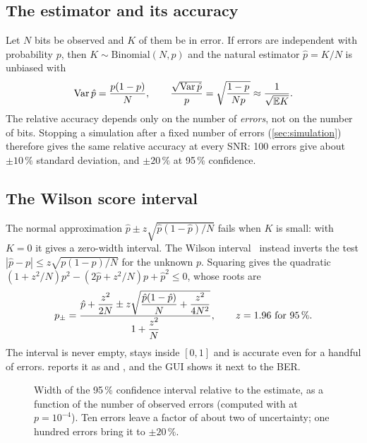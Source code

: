 \subsection{The estimator and its accuracy}
Let $N$ bits be observed and $K$ of them be in error. If errors are independent with
probability $p$, then $K\sim\mathrm{Binomial}(N,p)$ and the natural estimator
$\hat p=K/N$ is unbiased with
\begin{equation}
  \operatorname{Var}\hat p=\frac{p(1-p)}{N},\qquad
  \frac{\sqrt{\operatorname{Var}\hat p}}{p}=\sqrt{\frac{1-p}{Np}}\approx\frac{1}{\sqrt{\mathbb{E} K}} .
\end{equation}
The relative accuracy depends only on the number of \emph{errors}, not on the number of bits.
Stopping a simulation after a fixed number of errors (\cref{sec:simulation}) therefore gives the
same relative accuracy at every SNR: 100 errors give about $\pm10\,\%$ standard deviation, and
$\pm20\,\%$ at 95\,\% confidence.

\subsection{The Wilson score interval}
The normal approximation $\hat p\pm z\sqrt{\hat p(1-\hat p)/N}$ fails when $K$ is small: with
$K=0$ it gives a zero-width interval. The Wilson interval~\cite{wilson1927} instead inverts the test
$|\hat p-p|\le z\sqrt{p(1-p)/N}$ for the unknown $p$. Squaring gives the quadratic
$(1+z^2/N)p^2-(2\hat p+z^2/N)p+\hat p^2\le0$, whose roots are
\begin{equation}
  p_{\pm}=\frac{\hat p+\dfrac{z^2}{2N}\pm z\sqrt{\dfrac{\hat p(1-\hat p)}{N}+\dfrac{z^2}{4N^2}}}{1+\dfrac{z^2}{N}},
  \qquad z=1.96\ \text{for 95\,\%}.
  \label{eq:wilson}
\end{equation}
The interval is never empty, stays inside $[0,1]$ and is accurate even for a handful of errors.
 reports it as  and , and the GUI shows it next
to the BER.

\begin{figure}[htbp]
\centering
{}
\caption{Width of the 95\,\% confidence interval relative to the estimate, as a function of the
number of observed errors (computed with  at $p=10^{-4}$). Ten errors leave
a factor of about two of uncertainty; one hundred errors bring it to $\pm20\,\%$.}
\label{fig:wilson}
\end{figure}

